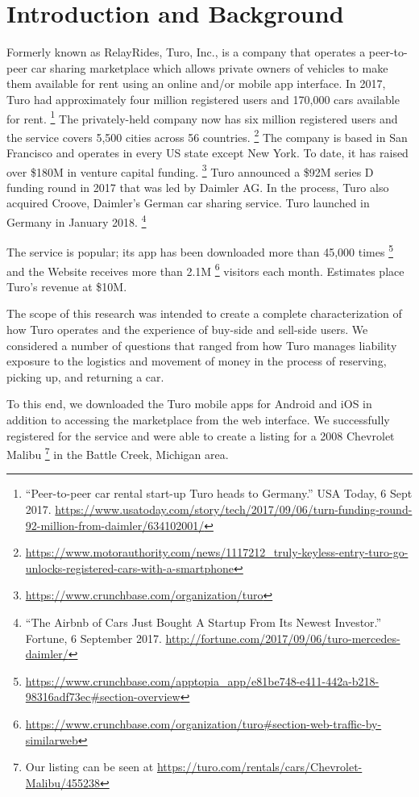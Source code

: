 \documentclass[review,12pt]{elsarticle}
\begin{document}
\linenumbers

\section{Introduction and Background}
Formerly known as RelayRides, Turo, Inc., is a company that operates a peer-to-peer car sharing marketplace which allows private owners of vehicles to make them available for rent using an online and/or mobile app interface. In 2017, Turo had approximately four million registered users and 170,000 cars available for rent.
  \footnote{``Peer-to-peer car rental start-up Turo heads to Germany.'' USA Today, 6 Sept 2017. \url{https://www.usatoday.com/story/tech/2017/09/06/turn-funding-round-92-million-from-daimler/634102001/}
  }
The privately-held company now has six million registered users and the service covers 5,500 cities across 56 countries.
\footnote{\url{https://www.motorauthority.com/news/1117212_truly-keyless-entry-turo-go-unlocks-registered-cars-with-a-smartphone}
}
The company is based in San Francisco and operates in every US state except New York. To date, it has raised over \$180M in venture capital funding.
  \footnote{\url{https://www.crunchbase.com/organization/turo}}
Turo announced a \$92M series D funding round in 2017 that was led by Daimler AG. In the process, Turo also acquired Croove, Daimler's German car sharing service. Turo launched in Germany in January 2018.
  \footnote{``The Airbnb of Cars Just Bought A Startup From Its Newest Investor.'' Fortune, 6 September 2017. \url{http://fortune.com/2017/09/06/turo-mercedes-daimler/}
  }

The service is popular; its app has been downloaded more than 45,000 times
\footnote{\url{https://www.crunchbase.com/apptopia_app/e81be748-e411-442a-b218-98316adf73ec\#section-overview}}
and the Website receives more than 2.1M
  \footnote{\url{https://www.crunchbase.com/organization/turo\#section-web-traffic-by-similarweb}}
visitors each month. Estimates place Turo's revenue at \$10M.

The scope of this research was intended to create a complete characterization of how Turo operates and the experience of buy-side and sell-side users. We considered a number of questions that ranged from how Turo manages liability exposure to the logistics and movement of money in the process of reserving, picking up, and returning a car.

To this end, we downloaded the Turo mobile apps for Android and iOS in addition to accessing the marketplace from the web interface. We successfully registered for the service and were able to create a listing for a 2008 Chevrolet Malibu
\footnote{Our listing can be seen at \url{https://turo.com/rentals/cars/Chevrolet-Malibu/455238}
}
in the Battle Creek, Michigan area.
\end{document}
